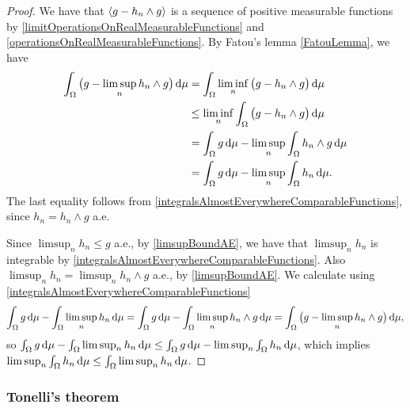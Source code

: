 \begin{proof}
We have that $\left\langle g - h_n\wedge g \right\rangle$ is a sequence of positive measurable functions by \ref{limitOperationsOnRealMeasurableFunctions} and \ref{operationsOnRealMeasurableFunctions}. By Fatou's lemma \ref{FatouLemma}, we have
\begin{align*}
\int_\Omega \big(g - \limsup_n h_n\wedge g\big)\operatorname{d \!}{\mu} &= \int_\Omega \liminf_n\big(g - h_n\wedge g\big)\operatorname{d \!}{\mu} \\
&\leq \liminf_n \int_\Omega \big(g - h_n\wedge g\big)\operatorname{d \!}{\mu} \\
&= \int_\Omega g \operatorname{d \!}{\mu} - \limsup_n \int_\Omega h_n\wedge g\operatorname{d \!}{\mu} \\
&= \int_\Omega g \operatorname{d \!}{\mu} - \limsup_n \int_\Omega h_n \operatorname{d \!}{\mu}.
\end{align*}
The last equality follows from \ref{integralsAlmostEverywhereComparableFunctions}, since $h_n = h_n \wedge g$ a.e.

Since $\limsup_n h_n \leq g$ a.e., by \ref{limsupBoundAE}, we have that $\limsup_n h_n$ is integrable by \ref{integralsAlmostEverywhereComparableFunctions}. Also $\limsup_n h_n = \limsup_n h_n \wedge g$ a.e., by \ref{limsupBoundAE}. We calculate using \ref{integralsAlmostEverywhereComparableFunctions}
\[ \int_\Omega g \operatorname{d \!}{\mu} - \int_\Omega \limsup_n h_n \operatorname{d \!}{\mu} = \int_\Omega g \operatorname{d \!}{\mu} - \int_\Omega \limsup_n h_n\wedge g \operatorname{d \!}{\mu} = \int_\Omega \big(g - \limsup_n h_n\wedge g \big) \operatorname{d \!}{\mu}, \]
so $\int_\Omega g \operatorname{d \!}{\mu} - \int_\Omega \limsup_n h_n \operatorname{d \!}{\mu} \leq \int_\Omega g \operatorname{d \!}{\mu} - \limsup_n \int_\Omega h_n \operatorname{d \!}{\mu}$, which implies $\limsup_n \int_\Omega h_n \operatorname{d \!}{\mu} \leq \int_\Omega \limsup_n h_n \operatorname{d \!}{\mu}$.
\end{proof}

\subsubsection{Tonelli's theorem}

